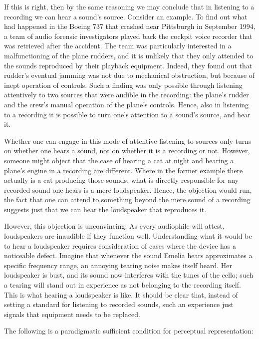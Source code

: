 \documentclass[sloppy, journal, git, bytitle, dodraft]{humapap}
\begin{document}
If this is right, then by the same reasoning we may conclude that in
listening to a recording we can hear a sound's source. Consider an
example. To find out what had happened in the Boeing 737 that crashed
near Pittsburgh in September 1994, a team of audio forensic
investigators played back the cockpit voice recorder that was retrieved
after the accident. The team was particularly interested in a
malfunctioning of the plane rudders, and it is unlikely that they only
attended to the sounds reproduced by their playback equipment. Indeed,
they found out that rudder's eventual jamming was not due to mechanical
obstruction, but because of inept operation of controls. Such a finding
was only possible through listening attentively to two sources that were
audible in the recording: the plane's rudder and the crew's manual
operation of the plane's controls. Hence, also in listening to a
recording it is possible to turn one's attention to a sound's source,
and hear it.

Whether one can engage in this mode of attentive listening to sources
only turns on whether one hears a sound, not on whether it is a
recording or not. However, someone might object that the case of hearing
a cat at night and hearing a plane's engine in a recording are
different. Where in the former example there actually is a cat producing
those sounds, what is directly responsible for any recorded sound one
hears is a mere loudspeaker. Hence, the objection would run, the fact
that one can attend to something beyond the mere sound of a recording
suggests just that we can hear the loudspeaker that reproduces it.

However, this objection is unconvincing. As every audiophile will
attest, loudspeakers are inaudible if they function well. Understanding
what it would be to hear a loudspeaker requires consideration of cases
where the device has a noticeable defect. Imagine that whenever the
sound Emelia hears approximates a specific frequency range, an annoying
tearing noise makes itself heard. Her loudspeaker is bust, and its sound
now interferes with the tunes of the cello; such a tearing will stand
out in experience as not belonging to the recording itself. This is what
hearing a loudspeaker is like. It should be clear that, instead of
setting a standard for listening to recorded sounds, such an experience
just signals that equipment needs to be replaced.



\sect The following is a paradigmatic sufficient condition for perceptual
representation:
\end{document}
